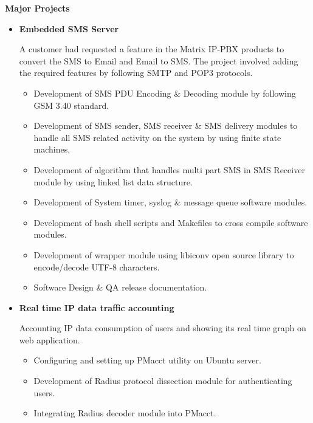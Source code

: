 \documentclass[letterpaper,10pt]{article}
\newcommand{\resitem}[1]{\item #1 \vspace{-2pt}}
\newcommand{\resheading}[1]{{\large \colorbox{mygrey}{\begin{minipage}{\textwidth}{\textbf{#1 \vphantom{p\^{E}}}}\end{minipage}}}}
\begin{document}
\resheading{Major Projects}
\begin{itemize}

\item
    \textbf{Embedded SMS Server}
    
    A customer had requested a feature in the Matrix IP-PBX products to convert the SMS to Email and Email to SMS. The project involved adding the required features by following SMTP and POP3 protocols.

	\begin{itemize}
		\resitem{Development of SMS PDU Encoding \& Decoding module by following GSM 3.40 standard.}
		
		\resitem{Development of SMS sender, SMS receiver \& SMS delivery modules to handle all SMS related activity on the system by using finite state machines.}
	    
	    \resitem{Development of algorithm that handles multi part SMS in SMS Receiver module by using linked list data structure.}
	    
	    \resitem{Development of System timer, syslog \& message queue software modules.}
	    
	    \resitem{Development of bash shell scripts and Makefiles to cross compile software modules.}
        
        \resitem{Development of wrapper module using libiconv open source library to encode/decode UTF-8 characters.}
        
        \resitem{Software Design \& QA release documentation.}
		
	\end{itemize}
	
\item
    \textbf{Real time IP data traffic accounting}
    
    Accounting IP data consumption of users and showing its real time graph on web application.
    
	\begin{itemize}
	    \resitem{Configuring and setting up PMacct utility on Ubuntu server.}
	
	    \resitem{Development of Radius protocol dissection module for authenticating users.}
		
		\resitem{Integrating Radius decoder module into PMacct.}
	\end{itemize}
	

\end{itemize}
\end{document}
